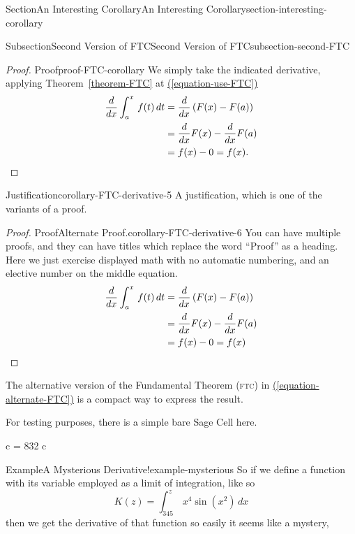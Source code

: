 \documentclass[twoside,10pt,]{article}
\newcommand{\xreffont}{\relax}
\newcommand{\acronym}[1]{\textsc{\MakeLowercase{#1}}}
\DeclareRobustCommand{\acronymintitle}[1]{\texorpdfstring{#1}{#1}}
\numberwithin{equation}{section}
\newcommand{\definiteintegral}[4]{\int_{#1}^{#2}\,#3\,d#4}
\begin{document}
\begin{sectionptx}{Section}{An Interesting Corollary}{}{An Interesting Corollary}{}{}{section-interesting-corollary}
\begin{subsectionptx}{Subsection}{Second Version of \acronymintitle{FTC}}{}{Second Version of \acronymintitle{FTC}}{}{}{subsection-second-FTC}
\begin{proof}{Proof}{}{proof-FTC-corollary}
We simply take the indicated derivative, applying Theorem~\hyperref[theorem-FTC]{{\xreffont\ref{theorem-FTC}}} at \hyperref[equation-use-FTC]{({\xreffont\ref{equation-use-FTC}})}%
\begin{align}
\frac{d}{dx}\definiteintegral{a}{x}{f(t)}{t}&=\frac{d}{dx}\left(F(x)-F(a)\right)\label{equation-use-FTC}\\
&=\frac{d}{dx}F(x)-\frac{d}{dx}F(a)\notag\\
&=f(x)-0 = f(x)\text{.}\label{equation-conclude}
\end{align}
%
\end{proof}
\begin{justification}{Justification}{}{corollary-FTC-derivative-5}
A justification, which is one of the variants of a proof.%
\end{justification}
\begin{proof}{Proof}{Alternate Proof.}{corollary-FTC-derivative-6}
You can have multiple proofs, and they can have titles which replace the word ``Proof'' as a heading.  Here we just exercise displayed math with no automatic numbering, and an elective number on the middle equation.%
\begin{align}
\frac{d}{dx}\definiteintegral{a}{x}{f(t)}{t}&=\frac{d}{dx}\left(F(x)-F(a)\right)\notag\\
&=\frac{d}{dx}F(x)-\frac{d}{dx}F(a)\label{corollary-FTC-derivative-6-2-2-2}\\
&=f(x)-0 = f(x)\notag
\end{align}
%
\end{proof}
The alternative version of the Fundamental Theorem (\acronym{FTC}) in \hyperref[equation-alternate-FTC]{({\xreffont\ref{equation-alternate-FTC}})} is a compact way to express the result.%
\par
For testing purposes, there is a simple bare Sage Cell here.%
\begin{sageinput}
c = 832
c
\end{sageinput}
\begin{example}{Example}{A Mysterious Derivative!}{example-mysterious}%
So if we define a function with its variable employed as a limit of integration, like so%
\begin{equation*}
K(z)=\definiteintegral{345}{z}{x^4\sin(x^2)}{x}
\end{equation*}
then we get the derivative of that function so easily it seems like a mystery,%
\begin{equation*}

\end{equation*}
\end{example}
\end{subsectionptx}
\end{sectionptx}
\end{document}
